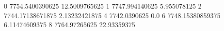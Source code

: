 0 7754.5400390625 12.5009765625
1 7747.994140625 5.955078125
2 7744.17138671875 2.13232421875
4 7742.0390625 0.0
6 7748.15380859375 6.11474609375
8 7764.97265625 22.93359375
